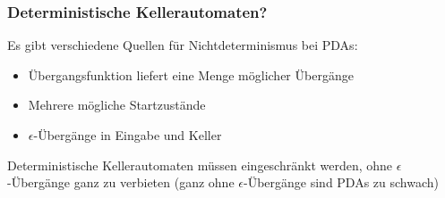 \documentclass[onlymath]{beamer}
\begin{document}
% 
% 
% 
% 


\begin{frame}\frametitle{Deterministische Kellerautomaten?}

Es gibt verschiedene Quellen für Nichtdeterminismus bei PDAs\pause:
\begin{itemize}
\item Übergangsfunktion liefert eine Menge möglicher Übergänge\pause
\item Mehrere mögliche Startzustände\pause
\item $\epsilon$-Übergänge in Eingabe und Keller\medskip

\end{itemize}

Deterministische Kellerautomaten müssen eingeschränkt werden, ohne 
$\epsilon$-Übergänge ganz zu verbieten (ganz ohne $\epsilon$-Übergänge sind PDAs zu schwach)

\end{frame}
\end{document}
